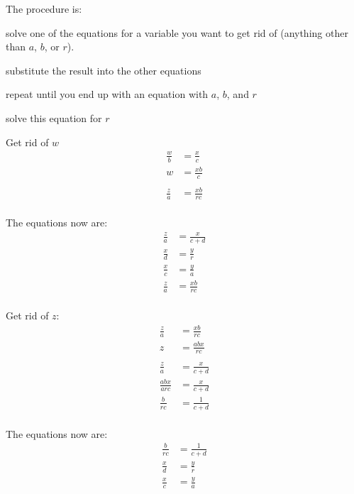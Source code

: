 \documentclass{exam}
\begin{document}
\begin{description}
\begin{parts}
          The procedure is:
          \begin{itemize*}
            \item solve one of the equations for a variable you want to get rid of (anything other than $a$, $b$, or
              $r$).
            \item substitute the result into the other equations
            \item repeat until you end up with an equation with $a$, $b$, and $r$
            \item solve this equation for $r$
          \end{itemize*}

          Get rid of $w$
          \begin{align*}
            \frac{w}{b} & = \frac{x}{c} \\
            w           & = \frac{xb}{c} \\
            \\
            \frac{z}{a} & = \frac{xb}{rc} \\
          \end{align*}

          The equations now are:
          \begin{align*}
            \frac{z}{a} & = \frac{x}{c + d} \\
            \frac{x}{d} & = \frac{y}{r} \\
            \frac{x}{c} & = \frac{y}{a} \\
            \frac{z}{a} & = \frac{xb}{rc} \\
          \end{align*}

          Get rid of $z$:
          \begin{align*}
            \frac{z}{a}     & = \frac{xb}{rc} \\
            z               & = \frac{abx}{rc} \\
            \\
            \frac{z}{a}     & = \frac{x}{c + d} \\
            \frac{abx}{arc} & = \frac{x}{c + d} \\
            \frac{b}{rc}    & = \frac{1}{c + d} \\
          \end{align*}

          The equations now are:
          \begin{align*}
            \frac{b}{rc} & = \frac{1}{c + d} \\
            \frac{x}{d}  & = \frac{y}{r} \\
            \frac{x}{c}  & = \frac{y}{a} \\
          \end{align*}


\end{parts}
\end{description}
\end{document}

